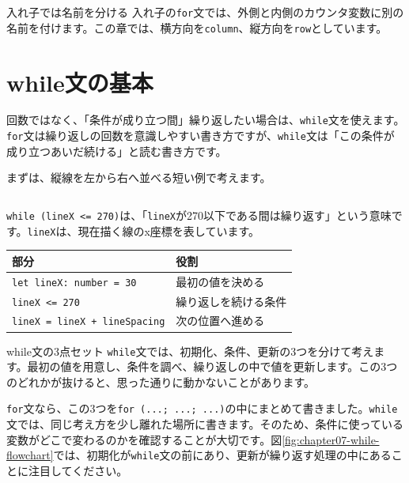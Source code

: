 \begin{notebox}{入れ子では名前を分ける}
入れ子の\texttt{for}文では、外側と内側のカウンタ変数に別の名前を付けます。この章では、横方向を\texttt{column}、縦方向を\texttt{row}としています。
\end{notebox}

\section{while文の基本}

回数ではなく、「条件が成り立つ間」繰り返したい場合は、\texttt{while}文を使えます。\texttt{for}文は繰り返しの回数を意識しやすい書き方ですが、\texttt{while}文は「この条件が成り立つあいだ続ける」と読む書き方です。

まずは、縦線を左から右へ並べる短い例で考えます。

\begin{listing}[htbp]
\inputminted{ts}{typescript-p5/listings/chapter07/while-lines.ts}
\caption{while文で線を並べる（\texttt{chapter07/while-lines.ts}）}
\label{lst:chapter07-while-lines}
\end{listing}

\texttt{while (lineX <= 270)}は、「\texttt{lineX}が270以下である間は繰り返す」という意味です。\texttt{lineX}は、現在描く線のx座標を表しています。

\begin{center}
\begin{tabular}{ll}
\toprule
部分 & 役割 \\
\midrule
\texttt{let lineX: number = 30} & 最初の値を決める \\
\texttt{lineX <= 270} & 繰り返しを続ける条件 \\
\texttt{lineX = lineX + lineSpacing} & 次の位置へ進める \\
\bottomrule
\end{tabular}
\end{center}

\begin{pointbox}{while文の3点セット}
\texttt{while}文では、初期化、条件、更新の3つを分けて考えます。最初の値を用意し、条件を調べ、繰り返しの中で値を更新します。この3つのどれかが抜けると、思った通りに動かないことがあります。
\end{pointbox}

\texttt{for}文なら、この3つを\texttt{for (...; ...; ...)}の中にまとめて書きました。\texttt{while}文では、同じ考え方を少し離れた場所に書きます。そのため、条件に使っている変数がどこで変わるのかを確認することが大切です。図\ref{fig:chapter07-while-flowchart}では、初期化が\texttt{while}文の前にあり、更新が繰り返す処理の中にあることに注目してください。

